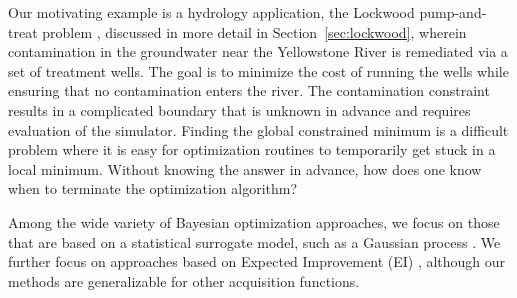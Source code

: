 \documentclass{article}
\begin{document}

%
%

Our motivating example is a hydrology application, the Lockwood pump-and-treat 
problem \citep{lockCite}, discussed in more detail in Section~\ref{sec:lockwood}, 
wherein contamination in the groundwater near the Yellowstone River is 
remediated via a set of treatment wells. The goal is to minimize the cost of 
running the wells while ensuring that no contamination enters the river. The 
contamination constraint results in a complicated boundary that is unknown in 
advance and requires evaluation of the simulator. Finding the global 
constrained minimum is a difficult problem where it is easy for optimization 
routines to temporarily get stuck in a local minimum. 
Without knowing the answer in advance, how does one know when to 
terminate the optimization algorithm? 

%
%

Among the wide variety of Bayesian optimization approaches, we focus
on those that are based on a statistical surrogate model, such as a
Gaussian process
\citep{santnerBook}. We further focus on approaches based on Expected
Improvement (EI) \citep{gBook}, although our methods are
generalizable for other acquisition functions. 

%
%
\end{document}

